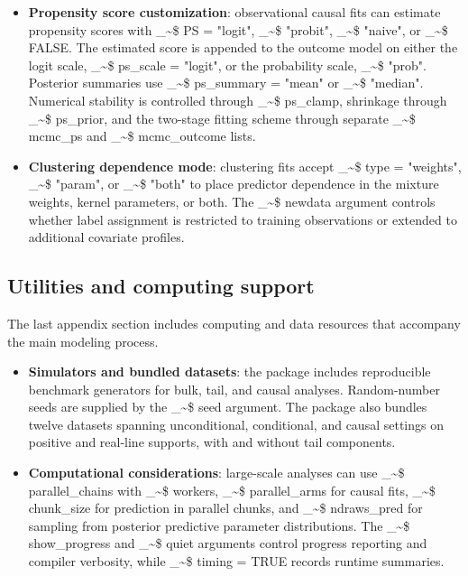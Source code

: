 \documentclass[preprint,12pt,authoryear]{elsarticle}
\makeatletter
\newcommand\code{\bgroup\@makeother\_\@makeother\~\@makeother\$\@codex}
\def\@codex#1{{\normalfont\ttfamily\hyphenchar\font=-1 #1}\egroup}
\makeatother
\begin{document}
\begin{itemize}
\item \textbf{Propensity score customization}: observational causal fits can estimate propensity scores with \code{PS = "logit"}, \code{"probit"}, \code{"naive"}, or \code{FALSE}. The estimated score is appended to the outcome model on either the logit scale, \code{ps\_scale = "logit"}, or the probability scale, \code{"prob"}. Posterior summaries use \code{ps\_summary = "mean"} or \code{"median"}. Numerical stability is controlled through \code{ps\_clamp}, shrinkage through \code{ps\_prior}, and the two-stage fitting scheme through separate \code{mcmc\_ps} and \code{mcmc\_outcome} lists.
\item \textbf{Clustering dependence mode}: clustering fits accept \code{type = "weights"}, \code{"param"}, or \code{"both"} to place predictor dependence in the mixture weights, kernel parameters, or both. The \code{newdata} argument controls whether label assignment is restricted to training observations or extended to additional covariate profiles.

\end{itemize}

\subsection{Utilities and computing support}

The last appendix section includes computing and data resources that
accompany the main modeling process.

\begin{itemize}
\item \textbf{Simulators and bundled datasets}: the package includes reproducible benchmark generators for bulk, tail, and causal analyses. Random-number seeds are supplied by the \code{seed} argument. The package also bundles twelve datasets spanning unconditional, conditional, and causal settings on positive and real-line supports, with and without tail components.
\item \textbf{Computational considerations}: large-scale analyses can use \code{parallel\_chains} with \code{workers}, \code{parallel\_arms} for causal fits, \code{chunk\_size} for prediction in parallel chunks, and \code{ndraws\_pred} for sampling from posterior predictive parameter distributions. The \code{show\_progress} and \code{quiet} arguments control progress reporting and compiler verbosity, while \code{timing = TRUE} records runtime summaries.
\end{itemize}
\end{document}
